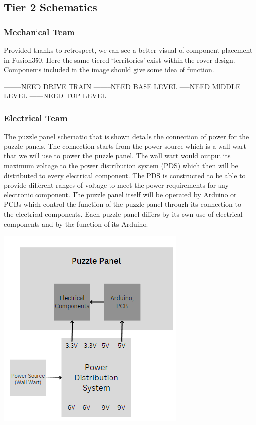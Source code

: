 \documentclass[a4paper, 10pt]{article}
\begin{document}
	\subsection{Tier 2 Schematics}
		\subsubsection{Mechanical Team}
		Provided thanks to retrospect, we can see a better visual of component placement in Fusion360. Here the same tiered `territories' exist within the rover design. Components included in the image should give some idea of function.
		
		--------NEED DRIVE TRAIN
		--------NEED BASE LEVEL
		-----NEED MIDDLE LEVEL
		------NEED TOP LEVEL
	
		\subsubsection{Electrical Team}
		The puzzle panel schematic that is shown details the connection of power for the puzzle panels. The connection starts from the power source which is a wall wart that we will use to power the puzzle panel. The wall wart would output its maximum voltage to the power distribution system (PDS) which then will be distributed to every electrical component. The PDS is constructed to be able to provide different ranges of voltage to meet the power requirements for any electronic component. The puzzle panel itself will be operated by Arduino or PCBs which control the function of the puzzle panel through its connection to the electrical components. Each puzzle panel differs by its own use of electrical components and by the function of its Arduino. 
	
		\includegraphics[scale=0.8]{Photos/Puzzle panel simplified}
		
\end{document}
